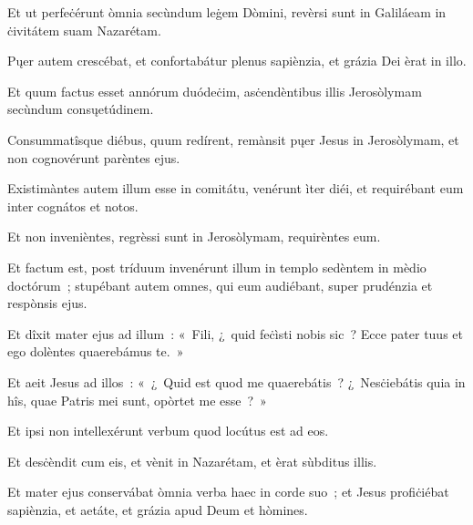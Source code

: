 Et ut perfeċérunt òmnia secùndum leġem Dòmini, revèrsi sunt in Galiláeam in ċivitátem suam Nazarétam. 

Pųer autem crescébat, et confortabátur plenus sapiènzia, et grázia Dei èrat in illo. 

\mysteryEnd
{}

Et quum factus esset annórum duódeċim, asċendèntibus illis Jerosòlymam secùndum consųetúdinem. 

Consummatîsque diébus, quum redírent, remànsit pųer Jesus in Jerosòlymam, et non cognovérunt parèntes ejus. 

Existimàntes autem illum esse in comitátu, venérunt ìter diéi, et requirébant eum inter cognátos et notos. 

Et non invenièntes, regrèssi sunt in Jerosòlymam, requirèntes eum. 

Et factum est, post tríduum invenérunt illum in templo sedèntem in mèdio doctórum~; stupébant autem omnes, qui eum audiébant, super prudénzia et respònsis ejus. 

Et dîxit mater ejus ad illum~: «~Fili, ¿~quid feċìsti nobis sic~? Ecce pater tuus et ego dolèntes quaerebámus te.~» 

Et aeit Jesus ad illos~: «~¿~Quid est quod me quaerebátis~? ¿~Nesċiebátis quia in hîs, quae Patris mei sunt, opòrtet me esse~?~» 

Et ipsi non intellexérunt verbum quod locútus est ad eos. 

Et desċèndit cum eis, et vènit in Nazarétam, et èrat sùbditus illis. 

Et mater ejus conservábat òmnia verba haec in corde suo~; et Jesus profiċiébat sapiènzia, et aetáte, et grázia apud Deum et hòmines. 

